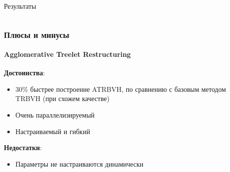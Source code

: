 \begin{frame}[t]{Результаты}
\begin{columns}
    \end{columns}

    \begin{center}
    \end{center}
\end{frame}

\begin{frame}[t]
    \frametitle{Плюсы и минусы}
    \framesubtitle{Agglomerative Treelet Restructuring}
    \textbf{Достоинства}:
    \begin{itemize}
        \item
            30\% быстрее построение ATRBVH, по сравнению с базовым методом TRBVH (при схожем качестве)
        \item
            Очень параллелизируемый
        \item
            Настраиваемый и гибкий
    \end{itemize}
    \textbf{Недостатки}:
    \begin{itemize}
        \item
            Параметры не настраиваются динамически
    \end{itemize}
\end{frame}

